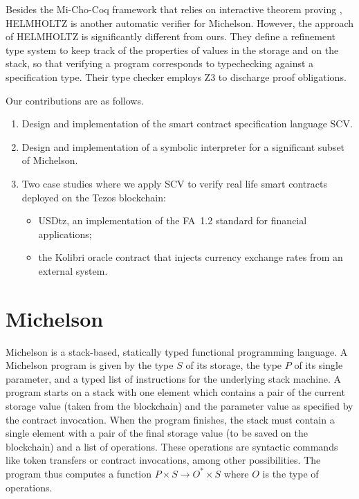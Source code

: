 \documentclass[a4paper,USenglish,cleveref, autoref,anonymous]{lipics-v2021}
\begin{document}
Besides the Mi-Cho-Coq framework that relies on interactive theorem
proving \cite{micho}, HELMHOLTZ \cite{helmholtz} is another automatic
verifier for Michelson. However, the approach of HELMHOLTZ is significantly
different from ours. They define a refinement type system to keep
track of the properties of values in the storage and on the
stack, so that verifying a program corresponds to typechecking against
a specification type. Their type checker employs Z3 to discharge proof obligations.

Our contributions are as follows.
\begin{enumerate}
\item Design and implementation of the smart contract specification
  language SCV.
\item Design and implementation of a symbolic interpreter for a
  significant subset of Michelson.
\item Two case studies where we apply SCV to verify real life smart
  contracts deployed on the Tezos blockchain:
  \begin{itemize}
  \item USDtz, an implementation of the FA~1.2 standard for financial
    applications;
  \item the Kolibri oracle contract that injects currency exchange
    rates from an external system.
  \end{itemize}
\end{enumerate}

\section{Michelson}
\label{sec:background}
\lstset{language=michelson}

Michelson is a stack-based, statically typed functional programming language.
A Michelson program is given by the type $S$ of its storage, the type $P$ of its single
parameter, and a typed list of instructions for the underlying stack machine.
A program starts on a stack with one element which contains a pair of
the current storage value (taken from the blockchain) and the
parameter value as specified by the
contract invocation.
When the program finishes, the stack must contain a single element with a pair
of the final storage value (to be saved on the blockchain) and a list
of operations.
These operations are syntactic commands like token transfers or
contract invocations, among other possibilities.
The program thus computes a function $P\times S \to O^* \times S$
where $O$ is the type of operations.
\end{document}
